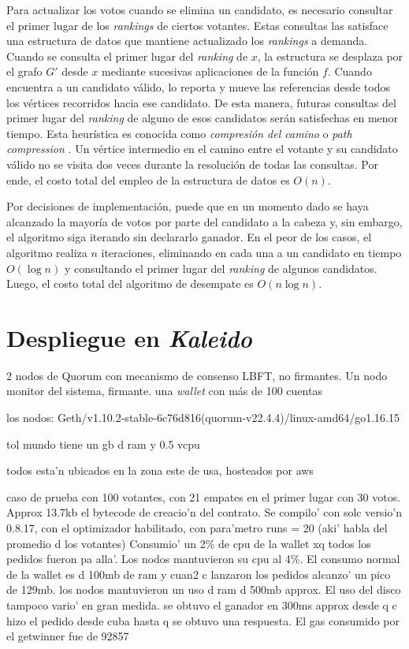 Para actualizar los votos cuando se elimina un candidato, es necesario consultar el primer lugar de los \textit{rankings} de ciertos votantes. Estas consultas las satisface una estructura de datos que mantiene actualizado los \textit{rankings} a demanda. Cuando se consulta el primer lugar del \textit{ranking} de $x$, la estructura se desplaza por el grafo $G'$ desde $x$ mediante sucesivas aplicaciones de la funci\'on $f$. Cuando encuentra a un candidato v\'alido, lo reporta y mueve las referencias desde todos los v\'ertices recorridos hacia ese candidato. De esta manera, futuras consultas del primer lugar del \textit{ranking} de alguno de esos candidatos ser\'an satisfechas en menor tiempo. Esta heur\'istica es conocida como \textit{compresi\'on del camino} o \textit{path compression} \citep{intro-to-algo-3}.  Un v\'ertice intermedio en el camino entre el votante y su candidato v\'alido no se visita dos veces durante la resoluci\'on de todas las consultas. Por ende, el costo total del empleo de la estructura de datos es $O(n)$.

Por decisiones de implementaci\'on, puede que en un momento dado se haya alcanzado la mayor\'ia de  votos por parte del candidato a la cabeza y, sin embargo, el algoritmo siga iterando sin declararlo ganador. En el peor de los casos, el algoritmo realiza $n$ iteraciones, eliminando en cada una a un candidato en tiempo $O(\log n)$ y consultando el primer lugar del \textit{ranking} de algunos candidatos. Luego, el costo total del algoritmo de desempate es $O(n \log n)$.

\section{Despliegue en \textit{Kaleido}}
2 nodos de Quorum con mecanismo de consenso LBFT, no firmantes. Un nodo monitor del sistema, firmante. una \textit{wallet} con m\'as de 100 cuentas

los nodos: Geth/v1.10.2-stable-6c76d816(quorum-v22.4.4)/linux-amd64/go1.16.15

tol mundo tiene un gb d ram y 0.5 vcpu

todos esta'n ubicados en la zona este de usa, hosteados por aws

caso de prueba con 100 votantes, con 21 empates en el primer lugar con 30 votos. Approx 13.7kb el bytecode de creacio'n del contrato. Se compilo' con solc versio'n 0.8.17, con el optimizador habilitado, con para'metro runs = 20 (aki' habla  del promedio d los votantes)  Consumio' un 2\% de cpu de la wallet xq todos los pedidos fueron pa alla'. Los nodos mantuvieron su cpu al 4\%. El consumo normal de la wallet es d 100mb de ram y cuan2 c lanzaron los pedidos alcanzo' un pico de 129mb. los nodos mantuvieron un uso d ram d 500mb approx. El uso del disco tampoco vario' en gran medida. se obtuvo el ganador en 300ms approx desde q c hizo el pedido desde cuba hasta q se obtuvo una respuesta. El gas consumido por el getwinner fue de 92857
